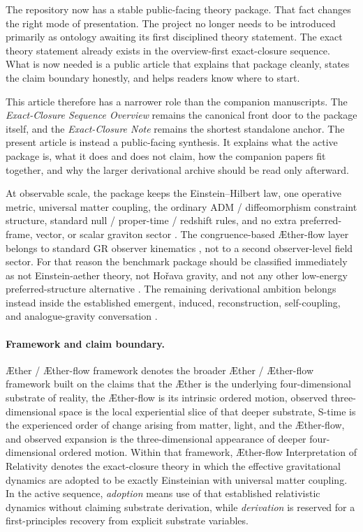 \documentclass[11pt]{article}
\newcommand{\Aether}{\AE{}ther}
\newcommand{\Aflow}{\AE{}ther-flow}
\newcommand{\TheoryName}{\Aflow{} Interpretation of Relativity}
\newcommand{\TheoryProgram}{\Aether{} / \Aflow{} framework}
\begin{document}
The repository now has a stable public-facing theory package. That fact changes the right mode of presentation. The project no longer needs to be introduced primarily as ontology awaiting its first disciplined theory statement. The exact theory statement already exists in the overview-first exact-closure sequence. What is now needed is a public article that explains that package cleanly, states the claim boundary honestly, and helps readers know where to start.

This article therefore has a narrower role than the companion manuscripts. The \emph{Exact-Closure Sequence Overview} remains the canonical front door to the package itself, and the \emph{Exact-Closure Note} remains the shortest standalone anchor. The present article is instead a public-facing synthesis. It explains what the active package is, what it does and does not claim, how the companion papers fit together, and why the larger derivational archive should be read only afterward.

At observable scale, the package keeps the Einstein--Hilbert law, one operative metric, universal matter coupling, the ordinary ADM / diffeomorphism constraint structure, standard null / proper-time / redshift rules, and no extra preferred-frame, vector, or scalar graviton sector \cite{Einstein1916,ADM1962}. The congruence-based \Aflow{} layer belongs to standard GR observer kinematics \cite{Raychaudhuri1955,EllisVanElst1999}, not to a second observer-level field sector. For that reason the benchmark package should be classified immediately as not Einstein-aether theory, not Ho\v{r}ava gravity, and not any other low-energy preferred-structure alternative \cite{JacobsonMattingly2001,JacobsonMattingly2004,ElingJacobson2004,Jacobson2010,Jacobson2014,JacobsonSperanza2015,Horava2009}. The remaining derivational ambition belongs instead inside the established emergent, induced, reconstruction, self-coupling, and analogue-gravity conversation \cite{Jacobson1995,Visser2002,HojmanKucharTeitelboim1976,Deser2004,Lovelock1971,BarceloLiberatiVisser2011,Sakharov1967}.

\paragraph{Framework and claim boundary.}
\TheoryProgram{} denotes the broader \Aether{} / \Aflow{} framework built on the claims that the \Aether{} is the underlying four-dimensional substrate of reality, the \Aflow{} is its intrinsic ordered motion, observed three-dimensional space is the local experiential slice of that deeper substrate, S-time is the experienced order of change arising from matter, light, and the \Aflow{}, and observed expansion is the three-dimensional appearance of deeper four-dimensional ordered motion. Within that framework, \TheoryName{} denotes the exact-closure theory in which the effective gravitational dynamics are adopted to be exactly Einsteinian with universal matter coupling. In the active sequence, \emph{adoption} means use of that established relativistic dynamics without claiming substrate derivation, while \emph{derivation} is reserved for a first-principles recovery from explicit substrate variables.
\end{document}
